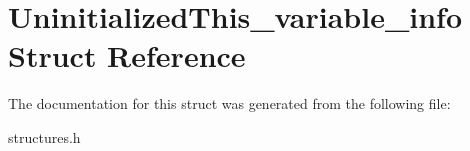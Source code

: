 \hypertarget{structUninitializedThis__variable__info}{}\section{Uninitialized\+This\+\_\+variable\+\_\+info Struct Reference}
\label{structUninitializedThis__variable__info}


The documentation for this struct was generated from the following file\+:\begin{DoxyCompactItemize}
\item 
structures.\+h\end{DoxyCompactItemize}
